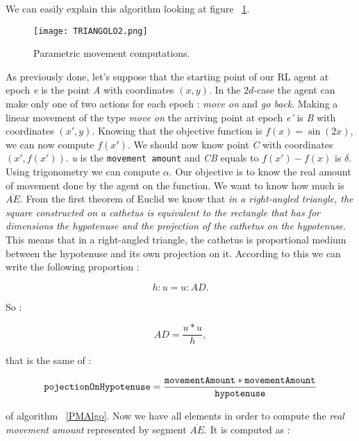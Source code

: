 We can easily explain this algorithm looking at figure ~\ref{fig:PMComputations}. 

\begin{figure} [h!]
	\centering
	\texttt{[image: TRIANGOLO2.png]}
	\caption{Parametric movement computations.}
	\label{fig:PMComputations}
\end{figure}

As previously done, let's suppose that the starting point of our RL agent at epoch \textit{e} is the point \textit{A} with coordinates $(x, y)$. In the $2d$-case the agent can make only one of two actions for each epoch : \textit{move on} and \textit{go back}. Making a linear movement of the type \textit{move on} the arriving point at epoch \textit{e'} is \textit{B} with coordinates $(x', y)$. Knowing that the objective function is $f(x) = \sin(2x)$, we can now compute $f(x')$. We should now know point \textit{C} with coordinates $(x', f(x'))$. \textit{u} is the {\tt movement amount} and \textit{CB} equals to $f(x') - f(x)$ is $\delta$. Using trigonometry we can compute $\alpha$. Our objective is to know the real amount of movement done by the agent on the function. We want to know how much is $\overline{AE}$.  From the first theorem of Euclid we know that \textit{in a right-angled triangle, the square constructed on a cathetus is equivalent to the rectangle that has for dimensions the hypotenuse and the projection of the cathetus on the hypotenuse}. This means that in a right-angled triangle, the cathetus is proportional medium between the hypotenuse and its own projection on it. According to this we can write the following proportion :

\begin{equation}
	h : u =  u : AD.
\end{equation}

So :

\begin{equation}
	AD = \dfrac{u * u}{h},
\end{equation}

that is the same of :

\begin{equation}
	 {\tt pojectionOnHypotenuse} = \dfrac{{\tt movementAmount} * {\tt movementAmount}}{{\tt hypotenuse}}
\end{equation}

of algorithm ~\ref{PMAlgo}. Now we have all elements in order to compute the \textit{real movement amount} represented by segment $\overline{AE}$. It is computed as :


